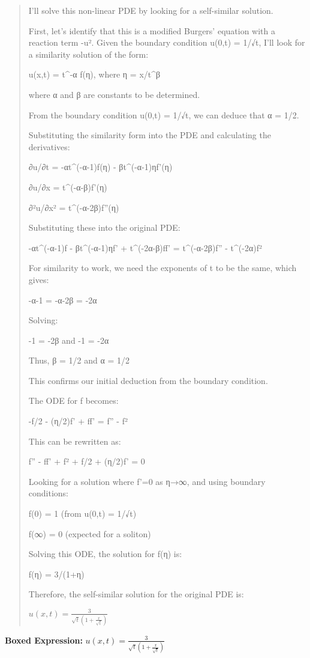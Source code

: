 \documentclass{article}
\begin{document}
\begin{quote}
I'll solve this non-linear PDE by looking for a self-similar solution.



First, let's identify that this is a modified Burgers' equation with a reaction term -u². Given the boundary condition u(0,t) = 1/√t, I'll look for a similarity solution of the form:



u(x,t) = t^{-α} f(η), where η = x/t^β



where α and β are constants to be determined.



From the boundary condition u(0,t) = 1/√t, we can deduce that α = 1/2.



Substituting the similarity form into the PDE and calculating the derivatives:

∂u/∂t = -αt^(-α-1)f(η) - βt^(-α-1)ηf'(η)

∂u/∂x = t^(-α-β)f'(η)

∂²u/∂x² = t^(-α-2β)f''(η)



Substituting these into the original PDE:

-αt^(-α-1)f - βt^(-α-1)ηf' + t^(-2α-β)ff' = t^(-α-2β)f'' - t^(-2α)f²



For similarity to work, we need the exponents of t to be the same, which gives:

-α-1 = -α-2β = -2α



Solving: 

-1 = -2β and -1 = -2α

Thus, β = 1/2 and α = 1/2



This confirms our initial deduction from the boundary condition.



The ODE for f becomes:

-f/2 - (η/2)f' + ff' = f'' - f²



This can be rewritten as:

f'' - ff' + f² + f/2 + (η/2)f' = 0



Looking for a solution where f'=0 as η→∞, and using boundary conditions:

f(0) = 1 (from u(0,t) = 1/√t)

f(∞) = 0 (expected for a soliton)



Solving this ODE, the solution for f(η) is:

f(η) = 3/(1+η)



Therefore, the self-similar solution for the original PDE is:



$\boxed{u(x,t) = \frac{3}{\sqrt{t}(1+\frac{x}{\sqrt{t}})}}$
\end{quote}
\textbf{Boxed Expression:} $u(x,t) = \frac{3}{\sqrt{t}(1+\frac{x}{\sqrt{t}})}$
\end{document}
